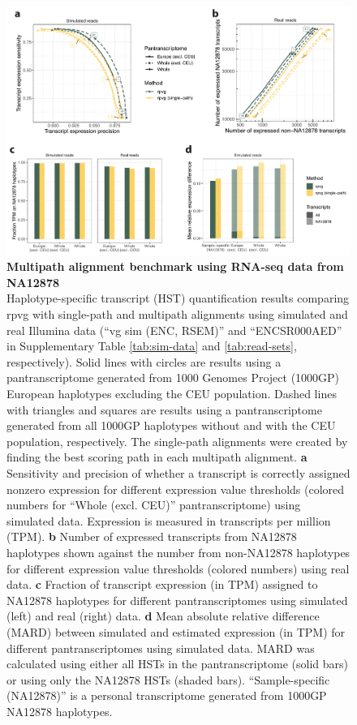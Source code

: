 \documentclass[11pt]{ucthesis}
\begin{document}
\begin{figure}[H]
\ssp
\begin{center}
\includegraphics[width=\textwidth]{mpmapfigures/figureS7.pdf}
\caption{\textbf{Multipath alignment benchmark using RNA-seq data from NA12878} \\
Haplotype-specific transcript (HST) quantification results comparing rpvg with single-path and multipath alignments using simulated and real Illumina data (``vg sim (ENC, RSEM)'' and ``ENCSR000AED'' in Supplementary Table \ref{tab:sim-data} and \ref{tab:read-sets}, respectively). Solid lines with circles are results using a pantranscriptome generated from 1000 Genomes Project (1000GP) European haplotypes excluding the CEU population. Dashed lines with triangles and squares are results using a pantranscriptome generated from all 1000GP haplotypes without and with the CEU population, respectively. The single-path alignments were created by finding the best scoring path in each multipath alignment. \textbf{a} Sensitivity and precision of whether a transcript is correctly assigned nonzero expression for different expression value thresholds (colored numbers for ``Whole (excl. CEU)'' pantranscriptome) using simulated data. Expression is measured in transcripts per million (TPM). \textbf{b} Number of expressed transcripts from NA12878 haplotypes shown against the number from non-NA12878 haplotypes for different expression value thresholds (colored numbers) using real data. \textbf{c} Fraction of transcript expression (in TPM) assigned to NA12878 haplotypes for different pantranscriptomes using simulated (left) and real (right) data. \textbf{d} Mean absolute relative difference (MARD) between simulated and estimated expression (in TPM) for different pantranscriptomes using simulated data. MARD was calculated using either all HSTs in the pantranscriptome (solid bars) or using only the NA12878 HSTs (shaded bars). ``Sample-specific (NA12878)'' is a personal transcriptome generated from 1000GP NA12878 haplotypes.
} \label{fig:expression-multipath}
\end{center}
\end{figure}
\end{document}
